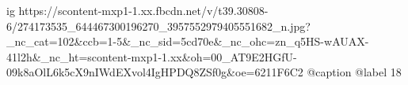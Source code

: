  
 
 
 
 

\ifcmt
  ig https://scontent-mxp1-1.xx.fbcdn.net/v/t39.30808-6/274173535_644467300196270_3957552979405551682_n.jpg?_nc_cat=102&ccb=1-5&_nc_sid=5cd70e&_nc_ohc=zn_q5HS-wAUAX-41l2h&_nc_ht=scontent-mxp1-1.xx&oh=00_AT9E2HGfU-09k8aOlL6k5cX9nIWdEXvol4IgHPDQ8ZSf0g&oe=6211F6C2
  @caption @label 18
\fi
